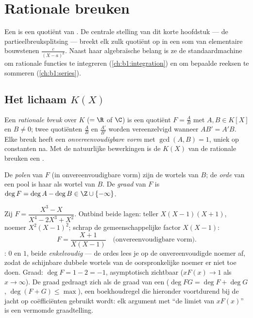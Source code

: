 \chapter{Rationale breuken}\label{ch:b1:fractions}

Een  is een quotiënt van . De centrale stelling
van dit korte hoofdstuk --- de
partieelbreuksplitsing --- breekt elk zulk
quotiënt op in een som van elementaire bouwstenen $\frac{c}{(X - a)^k}$.
Naast haar algebraïsche belang is ze de standaardmachine om rationale
functies te integreren (\cref{ch:b1:integration}) en om bepaalde reeksen
te sommeren (\cref{ch:b1:series}).

\section{Het lichaam $K(X)$}

\begin{definition}\label{def:b1:fractions:field}
Een \emph{rationale breuk} over $K$ ($= \R$ of
$\C$) is een quotiënt $F = \frac{A}{B}$ met $A, B \in K[X]$ en $B \neq
0$; twee quotiënten $\frac AB$ en $\frac{A'}{B'}$ worden vereenzelvigd
wanneer $AB' = A'B$. Elke breuk heeft een \emph{onvereenvoudigbare vorm}
met $\gcd(A, B) = 1$, uniek op constanten na. Met de natuurlijke
bewerkingen is de  $K(X)$ van de rationale breuken een
.

De \emph{polen} van $F$ (in onvereenvoudigbare vorm) zijn de
wortels van $B$; de \emph{orde} van een pool is haar  als
wortel van $B$. De \emph{graad} van $F$ is $\deg F = \deg A - \deg B \in
\Z \cup \{-\infty\}$.
\end{definition}

\begin{example}\label{ex:b1:fractions:vocab}
Zij $F = \dfrac{X^3 - X}{X^4 - 2X^3 + X^2}$. Ontbind beide lagen: teller
$X(X-1)(X+1)$, noemer $X^2(X-1)^2$; schrap de gemeenschappelijke factor
$X(X-1)$:
\[
F = \frac{X + 1}{X(X - 1)} \quad\text{(onvereenvoudigbare vorm).}
\]
: $0$ en $1$, beide \emph{enkelvoudig} --- de ordes lees je op de
onvereenvoudigde noemer af, zodat de schijnbare dubbele wortels van de
oorspronkelijke noemer er niet toe doen. Graad: $\deg F = 1 - 2 = -1$,
asymptotisch zichtbaar ($xF(x) \to 1$ als $x \to \infty$). De graad
gedraagt zich als de graad van een  ($\deg FG = \deg F + \deg G$,
$\deg(F + G) \leq \max$), een boekhoudregel die hieronder voortdurend bij
de jacht op coëfficiënten gebruikt wordt: elk argument met ``de limiet
van $xF(x)$'' is een vermomde graadtelling.
\end{example}


